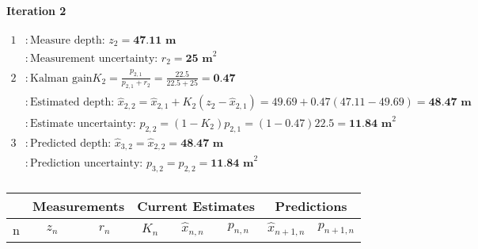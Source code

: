 \begin{example}
            \paragraph*{Iteration 2}
            \begin{equation*}
                \begin{aligned}
                    1 &: \text{Measure depth: } z_2 = \textbf{47.11 m} \\
                      &: \text{Measurement uncertainty: } r_2 = \textbf{25 m}^2 \\
                    2 &: \text{Kalman gain} K_2 = \frac{p_{2,1}}{p_{2,1}+r_2} = \frac{22.5}{22.5 + 25} = \textbf{0.47} \\
                      &: \text{Estimated depth: } \hat{x}_{2,2} = \hat{x}_{2,1} + K_2(z_2 - \hat{x}_{2,1}) = 49.69 + 0.47(47.11-49.69) = \textbf{48.47 m} \\
                      &: \text{Estimate uncertainty: } p_{2,2} = (1-K_2)p_{2,1} = (1-0.47)22.5 = \textbf{11.84 m}^2 \\
                    3 &: \text{Predicted depth: } \hat{x}_{3,2} = \hat{x}_{2,2} = \textbf{48.47 m} \\
                      &: \text{Prediction uncertainty: } p_{3,2} = p_{2,2} = \textbf{11.84 m}^2 \\
                \end{aligned}
            \end{equation*}

            \begin{center}
                \begin{tabular}{c | c | c | c | c | c | c | c}
                \toprule
                & \multicolumn{2}{c}{Measurements} & \multicolumn{3}{c}{Current Estimates} & \multicolumn{2}{c}{Predictions} \\
                \midrule
                n & $z_n$ & $r_n$ & $K_n$ & $\hat{x}_{n,n}$ & $ p_{n,n} $ & $ \hat{x}_{n+1,n}$ & $ p_{n+1,n} $ \\
                \midrule
    

\end{tabular}
\end{center}
\end{example}
